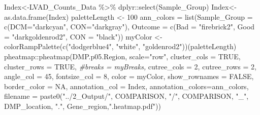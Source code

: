 \documentclass[
  10pt,
]{article}
\newenvironment{Shaded}{\begin{snugshade}}{\end{snugshade}}
\newcommand{\AttributeTok}[1]{\textcolor[rgb]{0.77,0.63,0.00}{#1}}
\newcommand{\CommentTok}[1]{\textcolor[rgb]{0.56,0.35,0.01}{\textit{#1}}}
\newcommand{\ConstantTok}[1]{\textcolor[rgb]{0.00,0.00,0.00}{#1}}
\newcommand{\DecValTok}[1]{\textcolor[rgb]{0.00,0.00,0.81}{#1}}
\newcommand{\FunctionTok}[1]{\textcolor[rgb]{0.00,0.00,0.00}{#1}}
\newcommand{\NormalTok}[1]{#1}
\newcommand{\OtherTok}[1]{\textcolor[rgb]{0.56,0.35,0.01}{#1}}
\newcommand{\SpecialCharTok}[1]{\textcolor[rgb]{0.00,0.00,0.00}{#1}}
\newcommand{\StringTok}[1]{\textcolor[rgb]{0.31,0.60,0.02}{#1}}
\begin{document}
\begin{Shaded}
\begin{Highlighting}[]
\NormalTok{Index}\OtherTok{\textless{}{-}}\NormalTok{LVAD\_Counts\_Data }\SpecialCharTok{\%\textgreater{}\%}\NormalTok{ dplyr}\SpecialCharTok{::}\FunctionTok{select}\NormalTok{(Sample\_Group)}
\NormalTok{Index}\OtherTok{\textless{}{-}}\FunctionTok{as.data.frame}\NormalTok{(Index)}
\NormalTok{paletteLength }\OtherTok{\textless{}{-}} \DecValTok{100}
\NormalTok{ann\_colors }\OtherTok{=} \FunctionTok{list}\NormalTok{(}\AttributeTok{Sample\_Group =} \FunctionTok{c}\NormalTok{(}\AttributeTok{DCM=}\StringTok{"darkcyan"}\NormalTok{, }\AttributeTok{CON=}\StringTok{"darkgray"}\NormalTok{), }\AttributeTok{Outcome =} \FunctionTok{c}\NormalTok{(}\AttributeTok{Bad =} \StringTok{"firebrick2"}\NormalTok{, }\AttributeTok{Good =} \StringTok{"darkgoldenrod2"}\NormalTok{, }\AttributeTok{CON =} \StringTok{"black"}\NormalTok{))}
\NormalTok{myColor }\OtherTok{\textless{}{-}} \FunctionTok{colorRampPalette}\NormalTok{(}\FunctionTok{c}\NormalTok{(}\StringTok{"dodgerblue4"}\NormalTok{, }\StringTok{"white"}\NormalTok{, }\StringTok{"goldenrod2"}\NormalTok{))(paletteLength)}
\NormalTok{pheatmap}\SpecialCharTok{::}\FunctionTok{pheatmap}\NormalTok{(DMP.p05.Region, }\AttributeTok{scale=}\StringTok{"row"}\NormalTok{, }
                      \AttributeTok{cluster\_cols =} \ConstantTok{TRUE}\NormalTok{, }
                      \AttributeTok{cluster\_rows =} \ConstantTok{TRUE}\NormalTok{,}
                      \CommentTok{\#breaks = myBreaks,}
                      \AttributeTok{cutree\_cols =} \DecValTok{2}\NormalTok{,}
                      \AttributeTok{cutree\_rows =} \DecValTok{2}\NormalTok{,}
                      \AttributeTok{angle\_col =} \DecValTok{45}\NormalTok{,}
                      \AttributeTok{fontsize\_col =} \DecValTok{8}\NormalTok{,}
                      \AttributeTok{color =}\NormalTok{ myColor, }
                      \AttributeTok{show\_rownames =} \ConstantTok{FALSE}\NormalTok{, }
                      \AttributeTok{border\_color =} \ConstantTok{NA}\NormalTok{, }
                      \AttributeTok{annotation\_col =}\NormalTok{ Index,}
                      \AttributeTok{annotation\_colors=}\NormalTok{ann\_colors,}
                      \AttributeTok{filename =} \FunctionTok{paste0}\NormalTok{(}\StringTok{"../2\_Output/"}\NormalTok{, COMPARISON, }\StringTok{"/"}\NormalTok{, COMPARISON, }\StringTok{"\_"}\NormalTok{, DMP\_location, }\StringTok{"."}\NormalTok{, Gene\_region,}\StringTok{".heatmap.pdf"}\NormalTok{))}


\end{Highlighting}
\end{Shaded}
\end{document}
